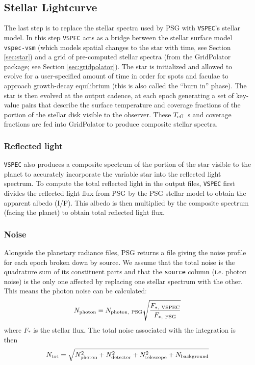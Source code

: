 \documentclass[twocolumn]{aastex631}
\newcommand{\teff}{$T_{\rm eff}$}
\newcommand{\vspec}[1]{\texttt{VSPEC}#1}
\begin{document}
\subsection{Stellar Lightcurve}

The last step is to replace the stellar spectra used by PSG with \vspec{}'s stellar model. In this step \vspec{} acts as a bridge between
the stellar surface model \texttt{vspec-vsm} (which models spatial changes to the star with time, see Section \ref{sec:star}) and a grid of
pre-computed stellar spectra (from the GridPolator package; see Section \ref{sec:gridpolator}). The star is initialized and allowed to evolve for a user-specified amount of time in order for spots and faculae to approach growth-decay equilibrium (this is also called the ``burn in'' phase). The star is then evolved at the output cadence, at each epoch generating a set of key-value pairs that describe the surface temperature and coverage fractions of the portion of the stellar disk visible to the observer. These \teff\ s and coverage fractions are fed into GridPolator to produce composite stellar spectra.

\subsubsection{Reflected light}
\vspec{} also produces a composite spectrum of the portion of the star visible to the planet to accurately incorporate the variable star into the reflected light spectrum. To compute the total reflected light in the output files, \vspec{} first divides the reflected light flux from PSG by the PSG stellar model to obtain the apparent albedo (I/F). This albedo is then multiplied
by the composite spectrum (facing the planet) to obtain total reflected light flux.

\subsubsection{Noise}
Alongside the planetary radiance files, PSG returns a file giving the noise profile for each epoch broken down by source. We assume that the total noise is the quadrature sum of its constituent parts and that the \texttt{source} column (i.e. photon noise) is the only one affected by replacing one stellar spectrum with the other. This means the photon noise can be calculated:
\begin{equation}
    N_{\rm photon} = N_{\rm photon,~PSG} \sqrt{\frac{F_{*,\rm ~VSPEC}}{F_{*,\rm ~PSG}}}
\end{equation}
where $F_*$ is the stellar flux. The total noise associated with the integration is then
\begin{equation}
    N_{\rm tot} = \sqrt{
        N_{\rm photon}^2 + N_{\rm detector}^2 + N_{\rm telescope}^2 + N_{\rm background}
    }
\end{equation}
\end{document}
